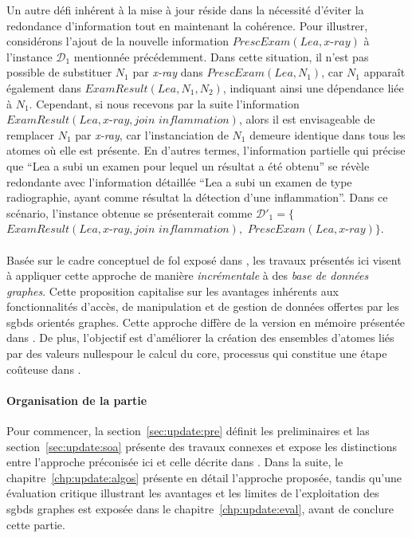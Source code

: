Un autre défi inhérent à la mise à jour réside dans la nécessité d'éviter la redondance d'information tout en maintenant la cohérence.
Pour illustrer, considérons l'ajout de la nouvelle information $PrescExam(Lea, \textit{x-ray})$ à l'instance $\mathcal{D}_1$ mentionnée précédemment.
Dans cette situation, il n'est pas possible de substituer $N_1$ par \textit{x-ray} dans $PrescExam(Lea, N_1)$, car $N_1$ apparaît également dans $ExamResult(Lea, N_1, N_2)$, indiquant ainsi une dépendance liée à $N_1$.
Cependant, si nous recevons par la suite l'information $ExamResult(Lea, \textit{x-ray}, \textit{join inflammation})$, alors il est envisageable de remplacer $N_1$ par \textit{x-ray}, car l'instanciation de $N_1$ demeure identique dans tous les atomes où elle est présente.
En d'autres termes, l'information partielle qui précise que \enquote{Lea a subi un examen pour lequel un résultat a été obtenu} se révèle redondante avec l'information détaillée \enquote{Lea a subi un examen de type radiographie, ayant comme résultat la détection d'une inflammation}.
Dans ce scénario, l'instance obtenue se présenterait comme $\mathcal{D}'_1 = \{$$ExamResult(Lea, \textit{x-ray}, \textit{join inflammation}),$ $PrescExam(Lea, \textit{x-ray})\}$.

\paragraph{}
Basée sur le cadre conceptuel de \gls{fol} exposé dans \cite{chabinConsistentUpdatingDatabases2020}, les travaux présentés ici visent à appliquer cette approche de manière \emph{incrémentale} à des \emph{base de données graphes}.
Cette proposition capitalise sur les avantages inhérents aux fonctionnalités d'accès, de manipulation et de gestion de données offertes par les \glspl{sgbd} orientés graphes.
Cette approche diffère de la version en mémoire présentée dans \cite{chabinConsistentUpdatingDatabases2020}.
De plus, l'objectif est d'améliorer la création des ensembles d'atomes liés par des valeurs nullespour le calcul du \gls{core}, processus qui constitue une étape coûteuse dans \cite{chabinConsistentUpdatingDatabases2020}.

\paragraph{Organisation de la partie}
Pour commencer, la section~\ref{sec:update:pre} définit les preliminaires et las section~\ref{sec:update:soa} présente des travaux connexes et expose les distinctions entre l'approche préconisée ici et celle décrite dans \cite{chabinConsistentUpdatingDatabases2020}.
Dans la suite, le chapitre~\ref{chp:update:algos} présente en détail l'approche proposée, tandis qu'une évaluation critique illustrant les avantages et les limites de l'exploitation des \glspl{sgbd} graphes est exposée dans le chapitre~\ref{chp:update:eval}, avant de conclure cette partie.
